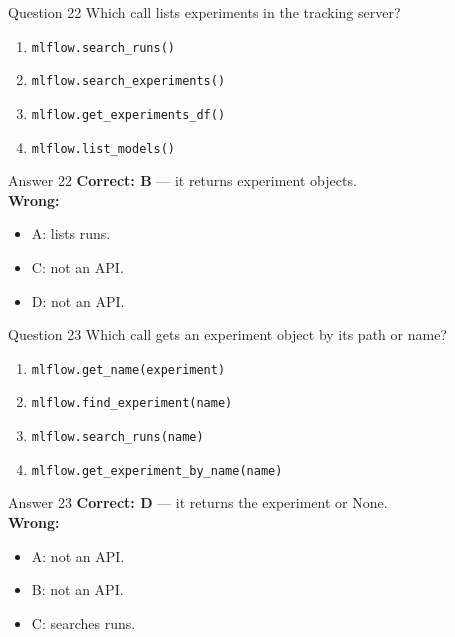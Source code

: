 \documentclass[aspectratio=169,11pt]{beamer}
\begin{document}
\begin{frame}{Question 22}
Which call lists experiments in the tracking server?
\begin{enumerate}[label=\Alph*.]
\item \texttt{mlflow.search\_runs()}
\item \texttt{mlflow.search\_experiments()}
\item \texttt{mlflow.get\_experiments\_df()}
\item \texttt{mlflow.list\_models()}
\end{enumerate}
\end{frame}
\begin{frame}{Answer 22}
\textbf{Correct: B} --- it returns experiment objects.\\
\vspace{0.5em}
\textbf{Wrong:}
\begin{itemize}
\item A: lists runs.
\item C: not an API.
\item D: not an API.
\end{itemize}
\end{frame}

\begin{frame}{Question 23}
Which call gets an experiment object by its path or name?
\begin{enumerate}[label=\Alph*.]
\item \texttt{mlflow.get\_name(experiment)}
\item \texttt{mlflow.find\_experiment(name)}
\item \texttt{mlflow.search\_runs(name)}
\item \texttt{mlflow.get\_experiment\_by\_name(name)}
\end{enumerate}
\end{frame}
\begin{frame}{Answer 23}
\textbf{Correct: D} --- it returns the experiment or None.\\
\vspace{0.5em}
\textbf{Wrong:}
\begin{itemize}
\item A: not an API.
\item B: not an API.
\item C: searches runs.
\end{itemize}
\end{frame}
\end{document}
